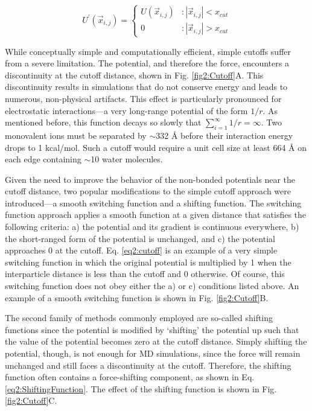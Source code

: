 \begin{equation}
   U^{\prime}(\vec{x}_{i,j}) = \left \{
   \begin{array}{lr}
      U(\vec{x}_{i,j}) & : \left | \vec{x}_{i,j} \right | < x_{cut} \\
      0 & : \left | \vec{x}_{i,j} \right | > x_{cut}
   \end{array}
   \right.
   \label{eq2:cutoff}
\end{equation}

While conceptually simple and computationally efficient, simple cutoffs suffer
from a severe limitation. The potential, and therefore the force, encounters a
discontinuity at the cutoff distance, shown in Fig.
\ref{fig2:Cutoff}A. This discontinuity results in simulations that do not
conserve energy and leads to numerous, non-physical artifacts.
\cite{Schreiber_JMolBiol_1992_v228_p909, Schreiber_Biochemistry_1992_v31_p5856,
Saito_JChemPhys_1994_v101_p4055, Auffinger_ChemPhysLett_1995_v234_p413,
Cheatham_JAmChemSoc_1995_v117_p4193, Feller_JPhysChem_1996_v100_p17011,
Patra_BiophysJ_2003_v84_p3636} This effect is particularly pronounced for
electrostatic interactions---a very long-range potential of the form $1/r$. As
mentioned before, this function decays so slowly that $\sum_{i=1}^{\infty} 1/r =
\infty$.  Two monovalent ions must be separated by $\sim$332 {\AA} before their
interaction energy drops to 1 kcal/mol. Such a cutoff would require a unit cell
size at least 664 {\AA} on each edge containing $\sim$10 water
molecules.

Given the need to improve the behavior of the non-bonded potentials near the
cutoff distance, two popular modifications to the simple cutoff approach were
introduced---a smooth switching function and a shifting function. The switching
function approach applies a smooth function at a given distance that satisfies
the following criteria: a) the potential and its gradient is continuous
everywhere, b) the short-ranged form of the potential is unchanged, and c) the
potential approaches 0 at the cutoff. Eq. \ref{eq2:cutoff} is an example of a
very simple switching function in which the original potential is multiplied by
1 when the interparticle distance is less than the cutoff and 0 otherwise. Of
course, this switching function does not obey either the a) or c) conditions
listed above. An example of a smooth switching function is shown in Fig.
\ref{fig2:Cutoff}B. \cite{Steinbach_JComputChem_1994_v15_p667}

The second family of methods commonly employed are so-called shifting functions
since the potential is modified by `shifting' the potential up such that the
value of the potential becomes zero at the cutoff distance.
\cite{Steinbach_JComputChem_1994_v15_p667, Allen_Tildesley} Simply shifting the
potential, though, is not enough for MD simulations, since the force will remain
unchanged and still faces a discontinuity at the cutoff. Therefore, the shifting
function often contains a force-shifting component, as shown in Eq.
\ref{eq2:ShiftingFunction}. \cite{Allen_Tildesley} The effect of the shifting
function is shown in Fig. \ref{fig2:Cutoff}C.

